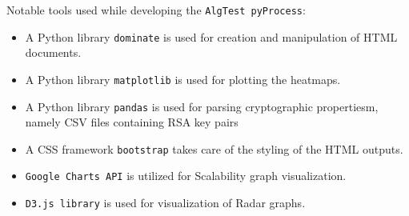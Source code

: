 Notable tools used while developing the \texttt{AlgTest pyProcess}:
\begin{itemize}
    \item A Python library \texttt{dominate} is used for creation and manipulation of HTML documents.
    \item A Python library \texttt{matplotlib} is used for plotting the heatmaps.
    \item A Python library \texttt{pandas} is used for parsing cryptographic propertiesm, namely CSV files containing RSA key pairs
    \item A CSS framework \texttt{bootstrap} takes care of the styling of the HTML outputs.
    \item \texttt{Google Charts API} is utilized for Scalability graph visualization.
    \item \texttt{D3.js library} is used for visualization of Radar graphs.
\end{itemize}

